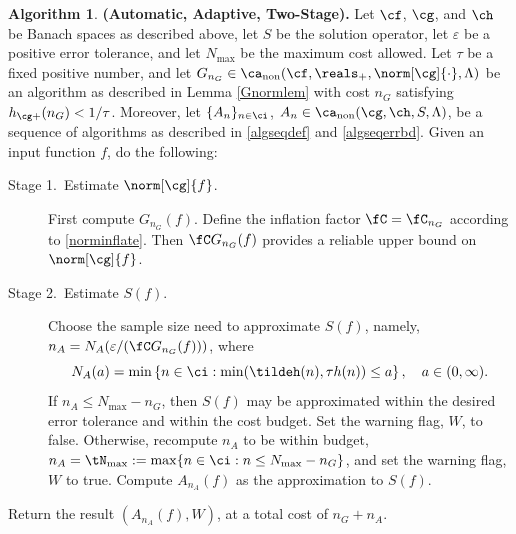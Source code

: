 \documentclass[]{elsarticle}
\DeclareMathOperator{\fix}{non}
\theoremstyle{definition}
\newtheorem{algo}{Algorithm}
\theoremstyle{remark}
\begin{document}
\begin{algo} \label{twostagedetalgo} {\bf (Automatic, Adaptive, Two-Stage).} Let $\cf$, $\cg$, and $\ch$ be Banach spaces as described above, let $S$ be the solution operator, let $\varepsilon$ be a positive error tolerance, and let $N_{\max}$ be the maximum cost allowed.  Let $\tau$ be a fixed positive number, and let $G_{n_G} \in \ca_{\fix}(\cf,\reals_+,\norm[\cg]{\cdot},\Lambda)$ be an algorithm as described in Lemma \ref{Gnormlem} with cost $n_G$ satisfying $h_{\cg+}(n_G) < 1/\tau$.
Moreover, let  $\{A_n\}_{n \in \ci}$, $A_n  \in \ca_{\fix}(\cg,\ch,S,\Lambda)$, be a sequence of algorithms as described in  \eqref{algseqdef} and \eqref{algseqerrbd}.  Given an input function $f$, do the following:

\begin{description} 

\item[Stage 1.\ Estimate {$\norm[\cg]{f}$}.] First compute $G_{n_G}(f)$.  Define the inflation factor $\fC=\fC_{n_G}$ according to \eqref{norminflate}.
Then $\fC G_{n_G}(f)$ provides a reliable upper bound on $\norm[\cg]{f}$.  

\item [Stage 2.\ Estimate {$S(f)$}.] Choose the sample size need to approximate $S(f)$, namely, $n_A=N_{A}(\varepsilon/(\fC G_{n_G}(f)))$, where 
\begin{equation} \label{Nmindef}
N_{A}(a)= \min\left\{ n \in \ci : \min(\tildeh(n),\tau h(n)) \le a \right\}, \quad a \in (0,\infty).
\end{equation}
If $n_A \le N_{\max}-n_G$, then $S(f)$ may be approximated within the desired error tolerance and within the cost budget.  Set the warning flag, $W$, to false. Otherwise, recompute $n_A$ to be within budget, $n_A = \tN_{\max} := \max\{n \in \ci : n\le N_{\max} -  n_G\}$, and set the warning flag, $W$ to true.  Compute $A_{n_A}(f)$ as the approximation to $S(f)$.
\end{description}

Return the result $(A_{n_A}(f),W)$, at a total cost of $n_G+n_A$.  
\end{algo}
\end{document}
